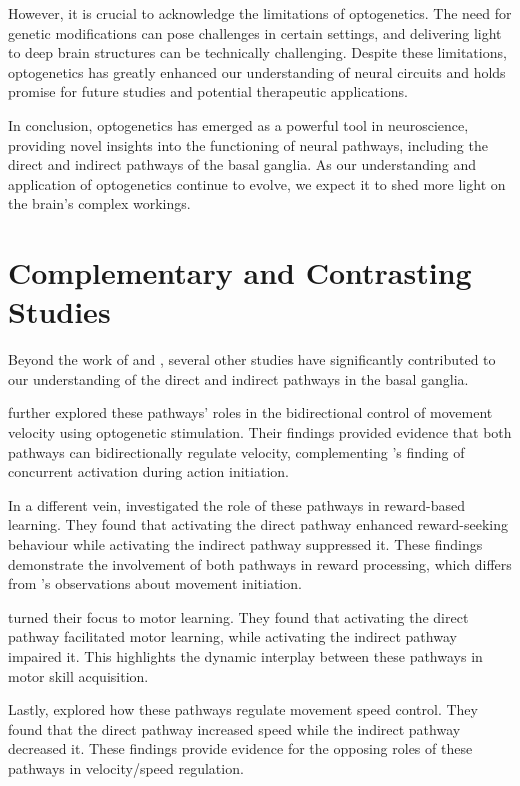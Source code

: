 \documentclass[10pt]{article}
\begin{document}
\begin{sloppypar}
  However, it is crucial to acknowledge the limitations of optogenetics. The need for genetic modifications can pose challenges in certain settings, and delivering light to deep brain structures can be technically challenging. Despite these limitations, optogenetics has greatly enhanced our understanding of neural circuits and holds promise for future studies and potential therapeutic applications.

  In conclusion, optogenetics has emerged as a powerful tool in neuroscience, providing novel insights into the functioning of neural pathways, including the direct and indirect pathways of the basal ganglia. As our understanding and application of optogenetics continue to evolve, we expect it to shed more light on the brain’s complex workings.

  \section{Complementary and Contrasting Studies}
  \label{sec:complementary-and-contrasting-studies}

  Beyond the work of \cite{cui_concurrent_2013} and \cite{kravitz_regulation_2010}, several other studies have significantly contributed to our understanding of the direct and indirect pathways in the basal ganglia.

  \cite{yttri_opponent_2016} further explored these pathways’ roles in the bidirectional control of movement velocity using optogenetic stimulation. Their findings provided evidence that both pathways can bidirectionally regulate velocity, complementing \cite{cui_concurrent_2013}’s finding of concurrent activation during action initiation.

  In a different vein, \cite{guillaumin_optogenetic_2020} investigated the role of these pathways in reward-based learning. They found that activating the direct pathway enhanced reward-seeking behaviour while activating the indirect pathway suppressed it. These findings demonstrate the involvement of both pathways in reward processing, which differs from \cite{cui_concurrent_2013}’s observations about movement initiation.

  \cite{hilt_evidence_2016} turned their focus to motor learning. They found that activating the direct pathway facilitated motor learning, while activating the indirect pathway impaired it. This highlights the dynamic interplay between these pathways in motor skill acquisition.

  Lastly, \cite{wang_direct_2015} explored how these pathways regulate movement speed control. They found that the direct pathway increased speed while the indirect pathway decreased it. These findings provide evidence for the opposing roles of these pathways in velocity/speed regulation.


\end{sloppypar}
\end{document}
